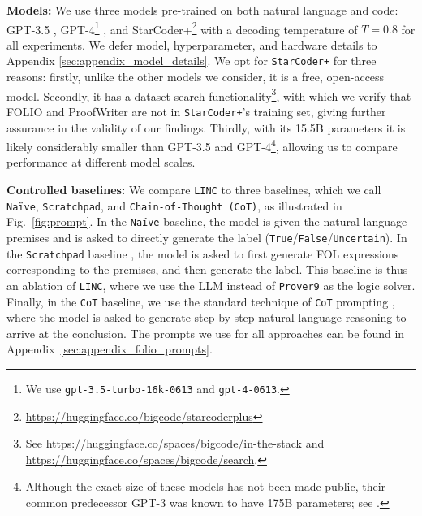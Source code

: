 \documentclass[11pt]{article}
\begin{document}
\textbf{Models:}
We use three models pre-trained on both natural language and code: GPT-3.5 \citep{ouyang2022training}, GPT-4\footnote{We use \texttt{gpt-3.5-turbo-16k-0613} and \texttt{gpt-4-0613}.} \citep{openai2023gpt4}, and StarCoder+\footnote{\url{https://huggingface.co/bigcode/starcoderplus}} \citep{li2023starcoder} with a decoding temperature of $T=0.8$ for all experiments. We defer model, hyperparameter, and hardware details to Appendix \ref{sec:appendix_model_details}.
We opt for \texttt{StarCoder+} for three reasons: firstly, unlike the other models we consider, it is a free, open-access model. Secondly, it has a dataset search functionality\footnote{See \url{https://huggingface.co/spaces/bigcode/in-the-stack} and \url{https://huggingface.co/spaces/bigcode/search}.}, with which we verify that FOLIO and ProofWriter are not in \texttt{StarCoder+}'s training set, giving further assurance in the validity of our findings. Thirdly, with its 15.5B parameters it is likely considerably smaller than GPT-3.5 and GPT-4\footnote{Although the exact size of these models has not been made public, their common predecessor GPT-3 was known to have 175B parameters; see \citet{brown2020language}.}, allowing us to compare performance at different model scales.

\textbf{Controlled baselines:}
\label{sec:controlled-baselines}
We compare \texttt{LINC} to three baselines, which we call \texttt{Na\"ive}, \texttt{Scratchpad}, and \texttt{Chain-of-Thought (CoT)}, as illustrated in Fig.~\ref{fig:prompt}.
In the \texttt{Na\"ive} baseline, the model is given the natural language premises and is asked to directly generate the label (\texttt{True}/\texttt{False}/\texttt{Uncertain}).
In the \texttt{Scratchpad} baseline \cite{nye2021show}, the model is asked to first generate FOL expressions corresponding to the premises, and then generate the label.
This baseline is thus an ablation of \texttt{LINC}, where we use the LLM instead of \texttt{Prover9} as the logic solver.
Finally, in the \texttt{CoT} baseline, we use the standard technique of \texttt{CoT} prompting \cite{wei2022chain,kojima2022large,wang2023self}, where the model is asked to generate step-by-step natural language reasoning to arrive at the conclusion.
The prompts we use for all approaches can be found in Appendix~\ref{sec:appendix_folio_prompts}.
\end{document}
